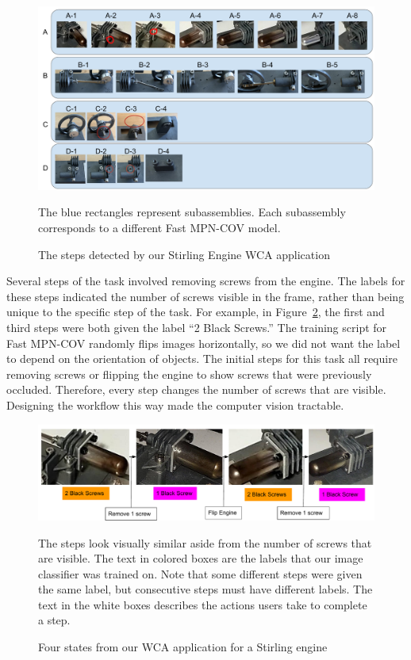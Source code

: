 \begin{figure}
  \includegraphics[width=\columnwidth]{figures/stirling_subassemblies.pdf}
  \begin{captiontext}
    The blue rectangles represent subassemblies.
    Each subassembly corresponds to a different Fast MPN-COV model.
  \end{captiontext}
  \caption{
    The steps detected by our Stirling Engine WCA application
  }\label{fig:stirling_subs}
\end{figure}

Several steps of the task involved removing screws from the engine.
The labels for these steps indicated the number of screws visible in the frame,
rather than being unique to the specific step of the task.
For example, in Figure~\ref{fig:stirling_steps}, the first and third steps
were both given the label ``2 Black Screws.''
The training script for Fast MPN-COV randomly flips images
horizontally, so we did not want the label to depend on the orientation of
objects.
The initial steps for this task all require removing screws or flipping the
engine to show screws that were previously occluded.
Therefore, every step changes the number of screws that are visible.
Designing the workflow this way made the computer vision tractable.

\begin{figure}
  \includegraphics[width=\columnwidth]{figures/stirling_steps.pdf}
  \begin{captiontext}
    The steps look visually similar aside from the number of screws that are
    visible. The text in colored boxes are the labels that our image classifier
    was trained on.
    Note that some different steps were given the same label, but consecutive
    steps must have different labels.
    The text in the white boxes describes the actions users take to complete a
    step.
  \end{captiontext}
  \caption{
    Four states from our WCA application for a Stirling engine
  }\label{fig:stirling_steps}
\end{figure}

